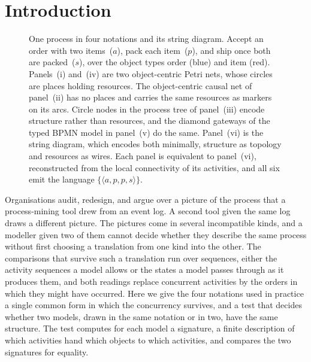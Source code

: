 \section{Introduction}\label{sec:introduction}

\begin{figure}[!t]
  \centering
  \resizebox{\linewidth}{!}{\unskip}
  \caption{One process in four notations and its string diagram. Accept an order with two
    items~($a$), pack each item~($p$), and ship once both are packed~($s$), over the object types
    order (blue) and item (red). Panels~(i) and~(iv) are two object-centric Petri nets, whose
    circles are places holding resources. The object-centric causal net of panel~(ii) has no places
    and carries the same resources as markers on its arcs. Circle nodes in the process tree of
    panel~(iii) encode structure rather than resources, and the diamond gateways of the typed BPMN
    model in panel~(v) do the same. Panel~(vi) is the string diagram, which encodes both minimally,
    structure as topology and resources as wires. Each panel is equivalent to panel~(vi),
    reconstructed from the local connectivity of its activities, and all six emit the language
    $\{\langle a,p,p,s\rangle\}$.}
  \label{fig:oc-two-faces}
\end{figure}

Organisations audit, redesign, and argue over a picture of the process that a process-mining tool
drew from an event log. A second tool given the same log draws a different picture. The pictures
come in several incompatible kinds, and a
modeller given two of them cannot decide whether they describe the same process without first
choosing a translation from one kind into the other. The comparisons that survive such a translation
run over sequences, either the activity sequences a model allows or the states a model passes
through as it produces them, and both readings replace concurrent activities by the orders in which
they might have occurred. Here we give the four notations used in practice a single common form in
which the concurrency survives, and a test that decides whether two models, drawn in the same
notation or in two, have the same structure. The test computes for each model a signature, a
finite description of which activities hand which objects to which activities, and compares the
two signatures for equality.

